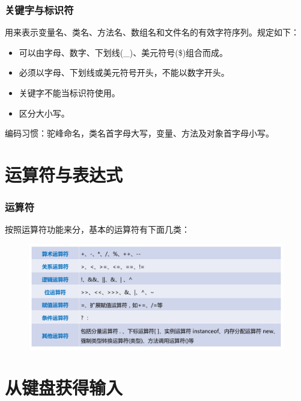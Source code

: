 \begin{frame}[fragile]
  \frametitle{关键字与标识符}

  
  用来表示变量名、类名、方法名、数组名和文件名的有效字符序列。规定如下：
  
  \begin{itemize}\kai
  \item 可以由字母、数字、下划线(\_)、美元符号(\$)组合而成。
  \item 必须以字母、下划线或美元符号开头，不能以数字开头。
  \item 关键字不能当标识符使用。
  \item 区分大小写。
  \end{itemize}

  {\kai\Red 编码习惯：驼峰命名，类名首字母大写，变量、方法及对象首字母小写。}

\end{frame}

\section{运算符与表达式}

\begin{frame}[fragile]
  \frametitle{运算符}

  按照运算符功能来分，基本的运算符有下面几类：

  \begin{figure}
    \centering
    \includegraphics[width=\textwidth]{ppt/operators.pdf}
  \end{figure}

  
\end{frame}

\section{从键盘获得输入}

